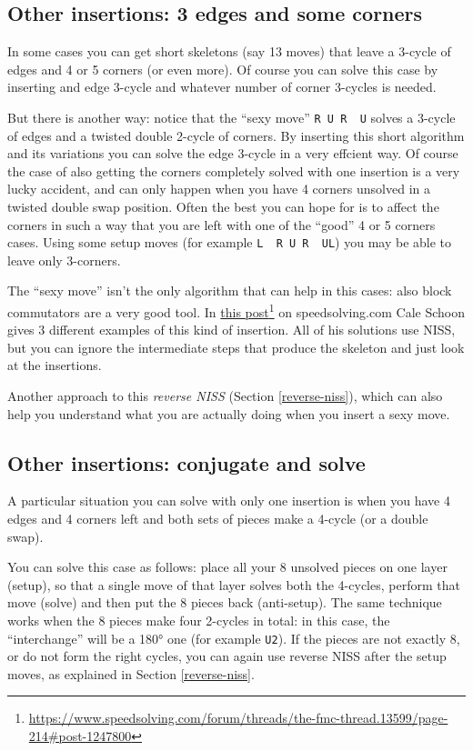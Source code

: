 \documentclass[11pt,a4paper]{book}
\newcommand{\p}{\textquotesingle}
\newcommand{\m}{\texttt}
\newcommand{\ps}{\p\,\,}
\begin{document}
\subsection{Other insertions: 3 edges and some corners}
\label{3enc}

In some cases you can get short skeletons (say 13 moves) that leave a 3-cycle of edges and 4 or 5 corners (or even more). Of course you can solve this case by inserting and edge 3-cycle and whatever number of corner 3-cycles is needed.

But there is another way: notice that the ``sexy move'' \m{R U R\ps U\p} solves a 3-cycle of edges and a twisted double 2-cycle of corners. By inserting this short algorithm and its variations you can solve the edge 3-cycle in a very effcient way. Of course the case of also getting the corners completely solved with one insertion is a very lucky accident, and can only happen when you have 4 corners unsolved in a twisted double swap position. Often the best you can hope for is to affect the corners in such a way that you are left with one of the ``good'' 4 or 5 corners cases. Using some setup moves (for example \m{L\ps R U R\ps U\p L}) you may be able to leave only 3-corners.

The ``sexy move'' isn't the only algorithm that can help in this cases: also block commutators are a very good tool. In \href{https://www.speedsolving.com/forum/threads/the-fmc-thread.13599/page-214\#post-1247800}{this post}\footnote{\url{https://www.speedsolving.com/forum/threads/the-fmc-thread.13599/page-214\#post-1247800}} on speedsolving.com Cale Schoon gives 3 different examples of this kind of insertion. All of his solutions use NISS, but you can ignore the intermediate steps that produce the skeleton and just look at the insertions.

Another approach to this \emph{reverse NISS} (Section \ref{reverse-niss}), which can also help you understand what you are actually doing when you insert a sexy move.

\subsection{Other insertions: conjugate and solve}

A particular situation you can solve with only one insertion is when you have 4 edges and 4 corners left and both sets of pieces make a 4-cycle (or a double swap).

You can solve this case as follows: place all your 8 unsolved pieces on one layer (setup), so that a single move of that layer solves both the 4-cycles, perform that move (solve) and then put the 8 pieces back (anti-setup). The same technique works when the 8 pieces make four 2-cycles in total: in this case, the ``interchange'' will be a 180° one (for example \m{U2}). If the pieces are not exactly 8, or do not form the right cycles, you can again use reverse NISS after the setup moves, as explained in Section \ref{reverse-niss}.
\end{document}
